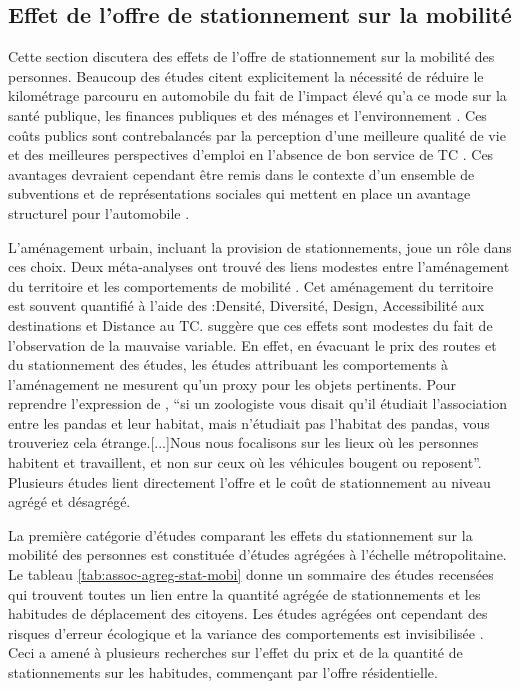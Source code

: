     \subsection{Effet de l'offre de stationnement sur la mobilité}\label{sec:stat-mobilite}
        Cette section discutera des effets de l'offre de stationnement sur la mobilité des personnes. Beaucoup des études citent explicitement la nécessité de réduire le kilométrage parcouru en automobile du fait de l'impact élevé qu'a ce mode sur la santé publique, les finances publiques et des ménages et l'environnement \parencite{miner_car_2024}. Ces coûts publics sont contrebalancés par la perception d'une meilleure qualité de vie \parencite{mouratidis_transport_2025} et des meilleures perspectives d'emploi en l'absence de bon service de \ac{TC} \parencite{smart_disentangling_2020}. Ces avantages devraient cependant être remis dans le contexte d'un ensemble de subventions et de représentations sociales qui mettent en place un avantage structurel pour l'automobile \parencite{olson_64_2019,mattioli_political_2020,seiler_republic_2008}.\par
        L'aménagement urbain, incluant la provision de stationnements, joue un rôle dans ces choix. Deux méta-analyses ont trouvé des liens modestes entre l'aménagement du territoire et les comportements de mobilité \parencite{stevens_does_2017,ewing_travel_2010}. Cet aménagement du territoire est souvent quantifié à l'aide des :Densité, Diversité, Design, Accessibilité aux destinations et Distance au \ac{TC}. \textcite{manville_travel_2017} suggère que ces effets sont modestes du fait de l'observation de la mauvaise variable. En effet, en évacuant le prix des routes et du stationnement des études, les études attribuant les comportements à l'aménagement ne mesurent qu'un proxy pour les objets pertinents. Pour reprendre l'expression de \citeauthor{manville_travel_2017}, \enquote{si un zoologiste vous disait qu'il étudiait l'association entre les pandas et leur habitat, mais n'étudiait pas l'habitat des pandas, vous trouveriez cela étrange.[...]Nous nous focalisons sur les lieux où les personnes habitent et travaillent, et non sur ceux où les véhicules bougent ou reposent}. Plusieurs études lient directement l'offre et le coût de stationnement au niveau agrégé et désagrégé. \par
       
        La première catégorie d'études comparant les effets du stationnement sur la mobilité des personnes est constituée d'études agrégées à l'échelle métropolitaine. Le tableau \ref{tab:assoc-agreg-stat-mobi} donne un sommaire des études recensées qui trouvent toutes un lien entre la quantité agrégée de stationnements et les habitudes de déplacement des citoyens. Les études agrégées ont cependant des risques d'erreur écologique et la variance des comportements est invisibilisée \parencite{ewing_travel_2010}. Ceci a amené à plusieurs recherches sur l'effet du prix et de la quantité de stationnements sur les habitudes, commençant par l'offre résidentielle.\par

